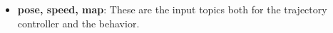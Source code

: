 \begin{itemize}
  \item \textbf{pose, speed, map}: These are the input topics both for the trajectory controller and the behavior.
\end{itemize}
